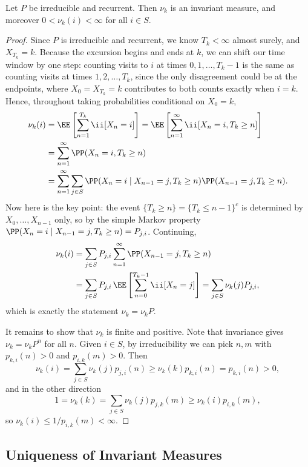 \documentclass[a4paper]{scrartcl}
\begin{document}
\begin{theorem}
	Let $P$ be irreducible and recurrent. Then $\nu_k$ is an invariant measure, and moreover $0 < \nu_k(i) < \infty$ for all $i \in S$.
\end{theorem}
\begin{proof}
	Since $P$ is irreducible and recurrent, we know $T_k < \infty$ almost surely, and $X_{T_k} = k$. Because the excursion begins and ends at $k$, we can shift our time window by one step: counting visits to $i$ at times $0, 1, \dots, T_k - 1$ is the same as counting visits at times $1, 2, \dots, T_k$, since the only disagreement could be at the endpoints, where $X_0 = X_{T_k} = k$ contributes to both counts exactly when $i = k$. Hence, throughout taking probabilities conditional on $X_0 = k$,
	\begin{align*}
		\nu_k(i) &= \EE\left[\sum_{n = 1}^{T_k} \ii[X_n = i]\right] = \EE\left[\sum_{n = 1}^{\infty} \ii[X_n = i, T_k \geq n]\right] \\
		&= \sum_{n = 1}^{\infty} \PP(X_n = i, T_k \geq n) \\
		&= \sum_{n = 1}^{\infty} \sum_{j \in S} \PP(X_n = i \mid X_{n - 1} = j, T_k \geq n)\PP(X_{n - 1} = j, T_k \geq n).
	\end{align*}
	Now here is the key point: the event $\{T_k \geq n\} = \{T_k \leq n - 1\}^c$ is determined by $X_0, \dots, X_{n - 1}$ only, so by the simple Markov property $\PP(X_n = i \mid X_{n - 1} = j, T_k \geq n) = P_{j, i}$. Continuing,
	\begin{align*}
		\nu_k(i) &= \sum_{j \in S} P_{j, i} \sum_{n = 1}^{\infty} \PP(X_{n - 1} = j, T_k \geq n) \\
		&= \sum_{j \in S} P_{j, i}\, \EE\left[\sum_{n = 0}^{T_k - 1} \ii[X_n = j]\right] = \sum_{j \in S} \nu_k(j) P_{j, i},
	\end{align*}
	which is exactly the statement $\nu_k = \nu_k P$.

	It remains to show that $\nu_k$ is finite and positive. Note that invariance gives $\nu_k = \nu_k P^n$ for all $n$. Given $i \in S$, by irreducibility we can pick $n, m$ with $p_{k, i}(n) > 0$ and $p_{i, k}(m) > 0$. Then
	$$
	\nu_k(i) = \sum_{j \in S} \nu_k(j) p_{j, i}(n) \geq \nu_k(k)p_{k, i}(n) = p_{k, i}(n) > 0,
	$$
	and in the other direction
	$$
	1 = \nu_k(k) = \sum_{j \in S} \nu_k(j) p_{j, k}(m) \geq \nu_k(i)p_{i, k}(m),
	$$
	so $\nu_k(i) \leq 1/p_{i, k}(m) < \infty$.
\end{proof}

\subsection{Uniqueness of Invariant Measures}
\end{document}
